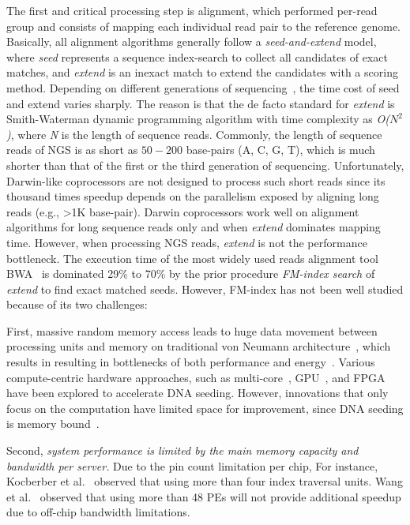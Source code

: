 \documentclass[9pt,conference]{IEEEtran}
\begin{document}
The first and critical processing step is alignment, which performed per-read group and consists of mapping each individual read pair to the reference genome. Basically, all alignment algorithms generally follow a \textit{seed-and-extend} model, where \textit{seed} represents a sequence index-search to collect all candidates of exact matches, and \textit{extend} is an inexact match to extend the candidates with a scoring method. 
Depending on different generations of sequencing~\cite{}, the time cost of seed and extend varies sharply. 
The reason is that the de facto standard for \textit{extend} is Smith-Waterman dynamic programming algorithm with time complexity as \textit{\textit{O}($N^2$)}, where \textit{N} is the length of sequence reads. 
Commonly, the length of sequence reads of NGS is as short as $50 - 200$ base-pairs (A, C, G, T), which is much shorter than that of the first or the third generation of sequencing. 
Unfortunately, Darwin-like coprocessors are not designed to process such short reads since its thousand times speedup depends on the parallelism exposed by aligning long reads (e.g., >1K base-pair). Darwin coprocessors work well on alignment algorithms for long sequence reads only and when \textit{extend} dominates mapping time.
However, when processing NGS reads, \textit{extend} is not the performance bottleneck. 
The execution time of the most widely used reads alignment tool BWA~\cite{li2013aligning} is dominated 29\% to 70\% by the prior procedure \textit{FM-index search} of \textit{extend} to find exact matched seeds. However, FM-index has not been well studied because of its two challenges: 

First, massive random memory access leads to huge data movement between processing units and memory on traditional von Neumann architecture~\cite{}, which results in resulting in bottlenecks of both performance and energy~\cite{}. Various compute-centric hardware approaches, such as multi-core~\cite{}, GPU~\cite{}, and FPGA~\cite{} have been explored to accelerate DNA seeding. However, innovations that only focus on the computation have limited space for improvement, since DNA seeding is memory bound~\cite{}. 

Second, \textit{system performance is limited by the main memory capacity and bandwidth per server.} Due to the pin count limitation per chip, For instance, Kocberber et al.~\cite{Kocberber:2013bb} observed that using more than four index traversal units. Wang et al.~\cite{yuanrong} observed that using more than 48 PEs will not provide additional speedup due to off-chip bandwidth limitations. 
\end{document}
